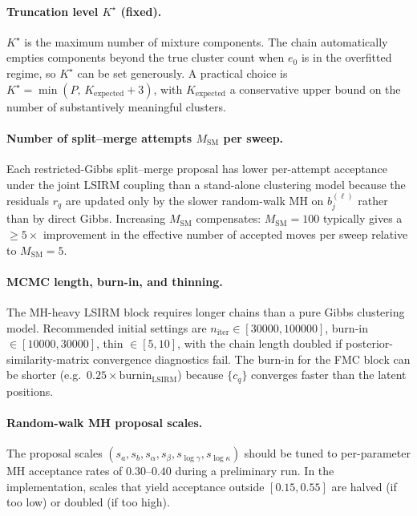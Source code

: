 \documentclass[11pt]{article}
\begin{document}
\paragraph{Truncation level $K^\star$ (fixed).}
$K^\star$ is the maximum number of mixture components.  The chain
automatically empties components beyond the true cluster count when
$e_0$ is in the overfitted regime, so $K^\star$ can be set generously.
A practical choice is $K^\star=\min(P,\,K_{\mathrm{expected}}+3)$, with
$K_{\mathrm{expected}}$ a conservative upper bound on the number of
substantively meaningful clusters.

\paragraph{Number of split--merge attempts $M_{\mathrm{SM}}$ per sweep.}
Each restricted-Gibbs split--merge proposal has lower per-attempt
acceptance under the joint LSIRM coupling than a stand-alone clustering
model because the residuals $r_q$ are updated only by the slower
random-walk MH on $b_j^{(\ell)}$ rather than by direct Gibbs.  Increasing
$M_{\mathrm{SM}}$ compensates: $M_{\mathrm{SM}}=100$ typically gives a
$\geq 5\times$ improvement in the effective number of accepted moves per
sweep relative to $M_{\mathrm{SM}}=5$.

\paragraph{MCMC length, burn-in, and thinning.}
The MH-heavy LSIRM block requires longer chains than a pure Gibbs
clustering model.  Recommended initial settings are $n_{\mathrm{iter}}\in
[30000,100000]$, burn-in $\in[10000,30000]$, thin $\in[5,10]$, with the
chain length doubled if posterior-similarity-matrix convergence diagnostics
fail.  The burn-in for the FMC block can be shorter (e.g.\
$0.25\times\mathrm{burnin}_{\mathrm{LSIRM}}$) because $\{c_q\}$ converges
faster than the latent positions.

\paragraph{Random-walk MH proposal scales.}
The proposal scales $(s_a,s_b,s_\alpha,s_\beta,s_{\log\gamma},
s_{\log\kappa})$ should be tuned to per-parameter MH acceptance rates of
$0.30$--$0.40$ during a preliminary run.  In the implementation, scales
that yield acceptance outside $[0.15,0.55]$ are halved (if too low) or
doubled (if too high).
\end{document}

